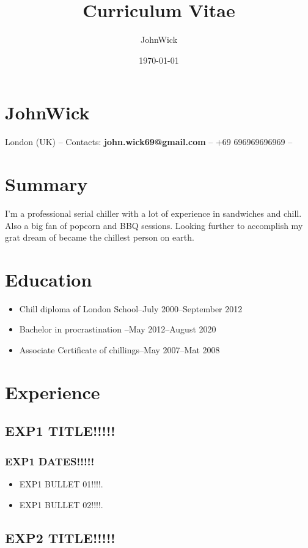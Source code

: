 \documentclass[a4paper, 9pt]{article}
\title{Curriculum Vitae}
\author{JohnWick}
\date{\today}
\begin{document}
\section*{JohnWick}

\small London (UK) -- Contacts: \textbf{john.wick69@gmail.com} -- +69 696969696969 --


\section*{Summary}
I'm a professional serial chiller with a lot of experience in sandwiches and chill. Also a big fan of popcorn and BBQ sessions. Looking further to accomplish my grat dream of became the chillest person on earth.


\section*{Education}
\begin{itemize}[noitemsep]
\item Chill diploma of London School--July 2000--September 2012
\item Bachelor in procrastination --May 2012--August 2020
\item Associate Certificate of chillings--May 2007--Mat 2008
\end{itemize}


\section*{Experience}

\subsection*{EXP1 TITLE!!!!!}
\subsubsection*{EXP1 DATES!!!!!}

\begin{itemize}[noitemsep]

\item EXP1 BULLET 01!!!!.
\item EXP1 BULLET 02!!!!.
\end{itemize}

\subsection*{EXP2 TITLE!!!!!}
\end{document}

